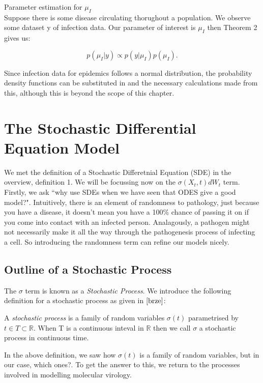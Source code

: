 \begin{example}{Parameter estimation for $\mu_I$} \\
    Suppose there is some disease circulating thorughout a population. We observe some dataset y of infection data. Our parameter of interest is $\mu_I$ then Theorem 2 gives us:

    \[
        p(\mu_I | y) \propto p(y|\mu_I)p(\mu_I)
    .\] 

Since infection data for epidemics follows a normal distribution, the probability density functions can be substituted in and the necessary calculations made from this, although this is beyond the scope of this chapter.
\end{example}

\section{The Stochastic Differential Equation Model}
We met the definition of a Stochastic Differetnial Equation (SDE) in the overview, definition 1. We will be focussing now on the $\sigma(X_t,t)dW_t$ term. Firstly, we ask ``why use SDEs when we have seen that ODES give a good model?". Intuitively, there is an element of randomness to pathology, just because you have a disease, it doesn't mean you have a 100\% chance of passing it on if you come into contact with an infected person. Analagously, a pathogen might not necessarily make it all the way through the pathogenesis process of infecting a cell. So introducing the randomness term can refine our models nicely.

\subsection{Outline of a Stochastic Process}
The $\sigma$ term is known as a  \textit{Stochastic Process}. We introduce the following definition for a stochastic process as given in $\cite{brze}$:

\begin{definition}
    A \textit{stochastic process} is a family of random variables $\sigma(t)$ parametrised by  $t \in T \subset \mathbb{R}$. When T is a continuous inteval in $\mathbb{R}$ then we call $\sigma$ a stochastic process in continuous time.
\end{definition}

In the above definition, we saw how $\sigma(t)$ is a family of random variables, but in our case, which ones?. To get the answer to this, we return to the processes involved in modelling molecular virology. 

